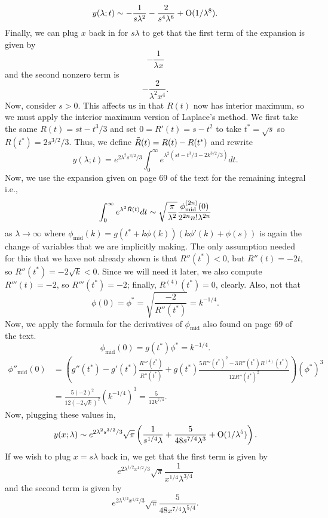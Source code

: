 \documentclass{article}
\begin{document}
\[
y(\lambda;t)\sim-\frac{1}{s\lambda^2}-\frac{2}{s^4\lambda^6}+\operatorname{O}(1/\lambda^8).
\]
Finally, we can plug $x$ back in for $s\lambda$ to get that the first term of the expansion is given by
\[
-\frac{1}{\lambda x}
\]
and the second nonzero term is
\[
-\frac{2}{\lambda^2 x^4}.
\]
Now, consider $s>0$. This affects us in that $R(t)$ now has interior maximum, so we must apply the interior maximum version of Laplace's method. We first take the same $R(t)=st-t^3/3$ and set $0=R'(t)=s-t^2$ to take $t^*=\sqrt{s}$ so $R(t^*)=2s^{3/2}/3$. Thus, we define $\Tilde{R}(t)=R(t)-R(t^*)$ and rewrite 
\[
y(\lambda;t)=e^{2\lambda^2s^{3/2}/3}\int_0^\infty e^{\lambda^2(st-t^3/3-2k^{3/2}/3)}dt.
\]
Now, we use the expansion given on page 69 of the text for the remaining integral i.e.,
\[
\int_0^\infty e^{\lambda^2\Tilde{R}(t)}dt\sim\sqrt{\frac{\pi}{\lambda^2}}\frac{\phi_{\text{mid}}^{(2n)}(0)}{2^{2n}n!\lambda^{2n}}
\]
as $\lambda\to\infty$ where $\phi_{\text{mid}}(k)=g(t^*+k\phi(k))(k\phi'(k)+\phi(s))$ is again the change of variables that we are implicitly making. The only assumption needed for this that we have not already shown is that $R''(t^*)<0$, but $R''(t)=-2t$, so $R''(t^*)=-2\sqrt{k}<0$. Since we will need it later, we also compute $R'''(t)=-2$, so $R'''(t^*)=-2$; finally, $R^{(4)}(t^*)=0$, clearly. Also, not that $$\phi(0)=\phi^*=\sqrt{\frac{-2}{R''(t^*)}}=k^{-1/4}.$$ Now, we apply the formula for the derivatives of $\phi_{\text{mid}}$ also found on page 69 of the text. 
\[
\phi_{\text{mid}}(0)=g(t^*)\phi^*=k^{-1/4}.
\]
\begin{align*}
\phi''_{\text{mid}}(0)&=\left(g''(t^*)-g'(t^*)\frac{R'''(t^*)}{R''(t^*)}+g(t^*)\frac{5R'''(t^*)^2-3R''(t^*)R^{(4)}(t^*)}{12R''(t^*)^2}\right)(\phi^*)^3\\&=
\frac{5(-2)^2}{12(-2\sqrt{k})^2}(k^{-1/4})^3=\frac{5}{12k^{7/4}}.
\end{align*}
Now, plugging these values in, 
\begin{align*}
y(x;\lambda)\sim e^{2\lambda^2s^{3/2}/3}\sqrt{\pi}\left(\frac{1}{s^{1/4}\lambda}+\frac{5}{48s^{7/4}\lambda^3}+\operatorname{O}(1/\lambda^5)\right).
\end{align*}
If we wish to plug $x=s\lambda$ back in, we get that the first term is given by
\[
e^{2\lambda^{1/2}x^{1/2}/3}\sqrt{\pi}\frac{1}{x^{1/4}\lambda^{3/4}}
\]
and the second term is given by
\[
e^{2\lambda^{1/2}x^{1/2}/3}\sqrt{\pi}\frac{5}{48x^{7/4}\lambda^{5/4}}.
\]
\end{document}

